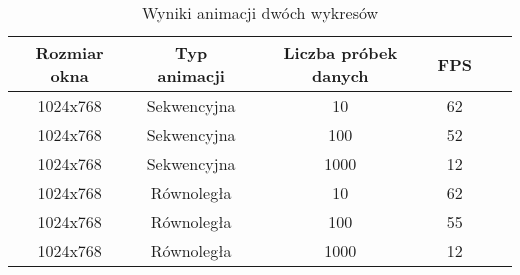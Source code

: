 \begin{table}\footnotesize
\centering
\caption{Wyniki animacji dwóch wykresów}\label{bench:two}
\label{tab:wykresy}
\begin{tabular}{|c|c|c|c|c|c|}
\hline
Rozmiar okna & Typ animacji & Liczba próbek danych & FPS\\
\hline
1024x768 & Sekwencyjna & 10 & 62\\
\hline
1024x768 & Sekwencyjna &  100 & 52\\
\hline
1024x768 & Sekwencyjna &  1000 & 12\\
\hline
1024x768 & Równoległa & 10 & 62\\
\hline
1024x768 & Równoległa &  100 & 55\\
\hline
1024x768 & Równoległa &  1000 & 12\\
\hline
\end{tabular}
\end{table}






